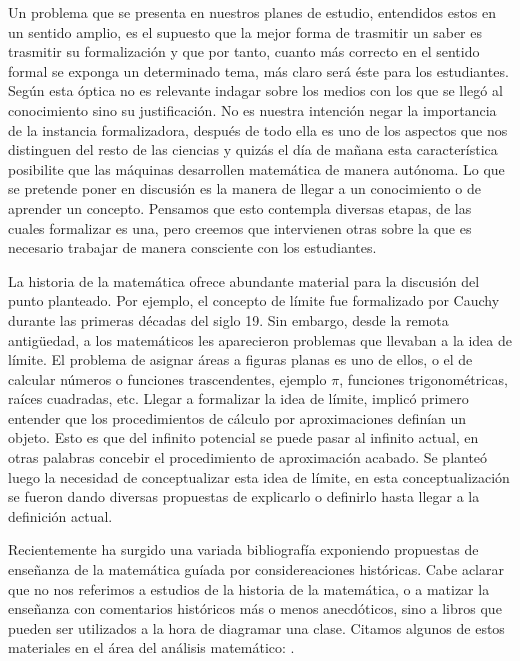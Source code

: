 \documentclass[a4paper,10pt,BCOR10mm,oneside,headsepline]{scrbook}
\begin{document}
 Un problema que se presenta en nuestros planes de estudio, entendidos estos en un sentido amplio, es el supuesto que la mejor forma de trasmitir un saber es trasmitir su formalización y que por tanto, cuanto más  correcto en el sentido formal se exponga un determinado tema, más claro será éste para los estudiantes. Según esta óptica no es relevante indagar sobre los medios con los que se llegó al conocimiento sino su justificación.    No es nuestra intención negar la importancia de la instancia formalizadora, después de todo ella es uno de los aspectos que nos distinguen del resto de las ciencias y quizás el día de mañana esta característica posibilite que las máquinas desarrollen matemática de manera autónoma.  Lo que se pretende poner en discusión es  la manera de llegar a un conocimiento o de aprender un concepto. Pensamos que esto contempla diversas etapas, de las cuales formalizar es una, pero creemos que intervienen otras sobre la que es necesario trabajar de manera consciente con los estudiantes.
 
La historia de la matemática ofrece abundante material para la discusión del punto planteado. Por ejemplo, el concepto de límite fue formalizado por Cauchy durante las primeras décadas del siglo 19. Sin embargo, desde la remota antig\"uedad,  a los matemáticos les aparecieron problemas que llevaban a la idea de límite. El problema de asignar áreas a figuras planas es uno de ellos, o el de calcular números o funciones trascendentes, ejemplo $\pi$, funciones trigonométricas, raíces cuadradas, etc. Llegar a formalizar la idea de límite, implicó primero entender que los procedimientos de cálculo por aproximaciones definían  un objeto. Esto es que del infinito potencial se puede pasar al infinito actual, en otras palabras  concebir el procedimiento de aproximación acabado. Se planteó luego la necesidad de conceptualizar esta idea de límite, en esta conceptualización se fueron dando diversas propuestas de explicarlo o definirlo hasta llegar a la definición actual. 

Recientemente ha surgido una variada bibliografía exponiendo propuestas de enseñanza de la matemática guíada por considereaciones históricas. Cabe aclarar que no nos referimos a estudios de la historia de la matemática, o a matizar la enseñanza con comentarios históricos más o menos anecdóticos,  sino a libros que pueden ser utilizados a la hora de diagramar una clase.  Citamos algunos de estos materiales  en el área del análisis matemático: \cite{hairer_history,shell_from,bressoud_anal,bressoud_lebes, toeplitz,Bressoud_compend}.
\end{document}
